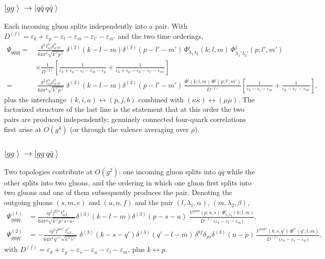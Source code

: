 \documentclass[11pt]{article}
\newcommand{\eps}{\varepsilon}
\newcommand{\ket}[1]{\left|#1\right\rangle}
\newcommand{\dthree}{\delta^{(3)}}
\newcommand{\Phiv}{\Phi}
\newcommand{\Vggg}{\mathcal{V}}
\begin{document}
\subsubsection{$\ket{gg}\to\ket{q\bar q\,q\bar q}$}
Each incoming gluon splits independently into a pair. With
$D^{(f)}=\eps_k+\eps_p-\eps_l-\eps_m-\eps_{l'}-\eps_{m'}$ and the two time orderings,
\begin{align}
\Psi_{q\bar q q\bar q}=&\;\frac{g^2\,t^a_{\alpha\beta}t^b_{\alpha'\beta'}}{64\pi^3\sqrt{k^+p^+}}\;
\dthree(k-l-m)\dthree(p-l'-m')\,
\Phiv^i_{\lambda_1\lambda_2}(k;l,m)\,\Phiv^j_{\lambda_1'\lambda_2'}(p;l',m')
\nonumber\\
&\times\frac{1}{D^{(f)}}
\left[\frac{1}{\eps_k+\eps_p-\eps_l-\eps_m-\eps_{p}}+\frac{1}{\eps_k+\eps_p-\eps_k-\eps_{l'}-\eps_{m'}}\right]
\nonumber\\
=&\;\frac{g^2\,t^a_{\alpha\beta}t^b_{\alpha'\beta'}}{64\pi^3\sqrt{k^+p^+}}\;
\dthree(k-l-m)\dthree(p-l'-m')\,
\frac{\Phiv^i(k;l,m)\,\Phiv^j(p;l',m')}{D^{(f)}}
\left[\frac{1}{\eps_k-\eps_l-\eps_m}+\frac{1}{\eps_p-\eps_{l'}-\eps_{m'}}\right],
\label{eq:Psiqqqq}
\end{align}
plus the interchange $(k,i,a)\leftrightarrow(p,j,b)$ combined with
$(\kappa\bar\kappa)\leftrightarrow(\mu\bar\mu)$. The factorized structure of the last line is the
statement that at this order the two pairs are produced independently; genuinely connected
four-quark correlations first arise at $O(g^4)$ (or through the valence averaging over $\rho$).

\subsubsection{$\ket{gg}\to\ket{gg\,q\bar q}$}
Two topologies contribute at $O(g^2)$: one incoming gluon splits into $q\bar q$ while the other
splits into two gluons, and the ordering in which one gluon first splits into two gluons and one of
them subsequently produces the pair. Denoting the outgoing gluons $(s,m,e)$ and $(u,n,f)$ and the
pair $(l,\lambda_1,\alpha)$, $(m,\lambda_2,\beta)$,
\begin{align}
\Psi^{(1)}_{ggq\bar q}&=\frac{ig^2f^{bfe}\,t^a_{\alpha\beta}}{64\pi^3\sqrt{k^+p^+s^+u^+}}
\dthree(k-l-m)\dthree(p-s-u)\;
\frac{\Vggg^{jnm}(p;u,s)\;\Phiv^i_{\lambda_1\lambda_2}(k;l,m)}{D^{(f)}\,\big(\eps_k-\eps_l-\eps_m\big)},
\nonumber\\
\Psi^{(2)}_{ggq\bar q}&=-\frac{ig^2f^{aec'}\,t^{c'}_{\alpha\beta}}{64\pi^3\,q'^+\sqrt{k^+s^+}}\;
\dthree(k-s-q')\dthree(q'-l-m)\,\delta^{bf}\delta_{jn}\dthree(u-p)\,
\frac{\Vggg^{imk'}(k;s,q')\,\Phiv^{k'}(q';l,m)}{D^{(f)}\big(\eps_k-\eps_s-\eps_{q'}\big)},
\end{align}
with $D^{(f)}=\eps_k+\eps_p-\eps_s-\eps_u-\eps_l-\eps_m$, plus $k\leftrightarrow p$.
\end{document}
